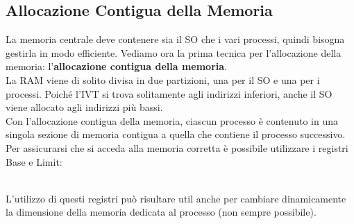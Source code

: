 \documentclass{article}
\begin{document}
		\subsection{Allocazione Contigua della Memoria}
			La memoria centrale deve contenere sia il SO che i vari processi, quindi bisogna gestirla in modo efficiente. Vediamo ora la prima tecnica per l'allocazione della memoria: l'\textbf{allocazione contigua della memoria}.
			\\La RAM viene di solito divisa in due partizioni, una per il SO e una per i processi. Poiché l'IVT si trova solitamente agli indirizzi inferiori, anche il SO viene allocato agli indirizzi più bassi.
			\\Con l’allocazione contigua della memoria, ciascun processo è contenuto in una singola sezione di memoria contigua a quella che contiene il processo successivo. Per assicurarsi che si acceda alla memoria corretta è possibile utilizzare i registri Base e Limit:
			\begin{figure}[ht!]
			\end{figure}
			\\L'utilizzo di questi registri può risultare util anche per cambiare dinamicamente la dimensione della memoria dedicata al processo (non sempre possibile).
\end{document}
